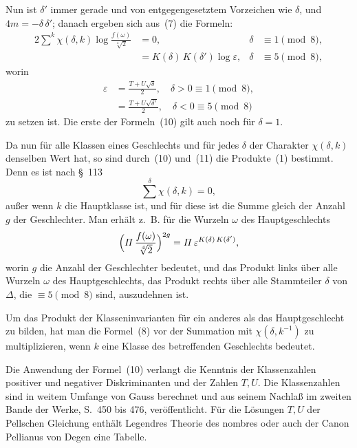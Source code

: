 \documentclass[12pt,a4paper]{article}
\theoremstyle{definition}
\begin{document}
Nun ist $\delta'$ immer gerade und von entgegengesetztem Vorzeichen wie 
$\delta$, und $4m = -\delta\,\delta'$; danach ergeben sich aus~(7) die 
Formeln:
\begin{equation}
\begin{aligned}
2\sum^{k}\chi(\delta, k)\log\frac{f(\omega)}{\sqrt[4]{2}} &= 0,
&\delta &\equiv 1 \pmod 8,\\
&= K(\delta)\,K(\delta')\log\varepsilon,
&\delta &\equiv 5 \pmod 8,
\end{aligned}
\end{equation}
worin
\begin{equation}
\begin{aligned}
\varepsilon &= \frac{T + U\sqrt{\delta}}{2},\quad \delta > 0 \equiv 1 \pmod 8,\\
&= \frac{T + U\sqrt{\delta'}}{2},\quad \delta < 0 \equiv 5 \pmod 8
\end{aligned}
\end{equation}
zu setzen ist. Die erste der Formeln~(10) gilt auch noch für $\delta = 1$.

Da nun für alle Klassen eines Geschlechts und für jedes $\delta$ der 
Charakter $\chi(\delta, k)$ denselben Wert hat, so sind durch~(10) und~(11) 
die Produkte~(1) bestimmt. Denn es ist nach \S~113
\[
\sum^{\delta}\chi(\delta, k) = 0,
\]
außer wenn $k$ die Hauptklasse ist, und für diese ist die Summe gleich der 
Anzahl $g$ der Geschlechter. Man erhält z.~B. für die Wurzeln $\omega$ des 
Hauptgeschlechts
\[
\Bigl(\varPi\,\frac{f(\omega)}{\sqrt[4]{2}}\Bigr)^{2g} =
\varPi\,\varepsilon^{K(\delta)\,K(\delta')},
\]
worin $g$ die Anzahl der Geschlechter bedeutet, und das Produkt links über 
alle Wurzeln $\omega$ des Hauptgeschlechts, das Produkt rechts über alle 
Stammteiler $\delta$ von $\varDelta$, die $\equiv 5 \pmod 8$ sind, 
auszudehnen ist.

Um das Produkt der Klasseninvarianten für ein anderes als das 
Hauptgeschlecht zu bilden, hat man die Formel~(8) vor der Summation mit 
$\chi(\delta, k^{-1})$ zu multiplizieren, wenn $k$ eine Klasse des 
betreffenden Geschlechts bedeutet.

Die Anwendung der Formel~(10) verlangt die Kenntnis der Klassenzahlen 
positiver und negativer Diskriminanten und der Zahlen $T, U$. Die 
Klassenzahlen sind in weitem Umfange von Gauss berechnet und aus seinem 
Nachlaß im zweiten Bande der Werke, S.~450 bis 476, veröffentlicht. Für 
die Lösungen $T, U$ der Pellschen Gleichung enthält Legendres \glqq{}Theorie 
des nombres\grqq{} oder auch der \glqq{}Canon Pellianus\grqq{} von Degen 
eine Tabelle.
\end{document}

